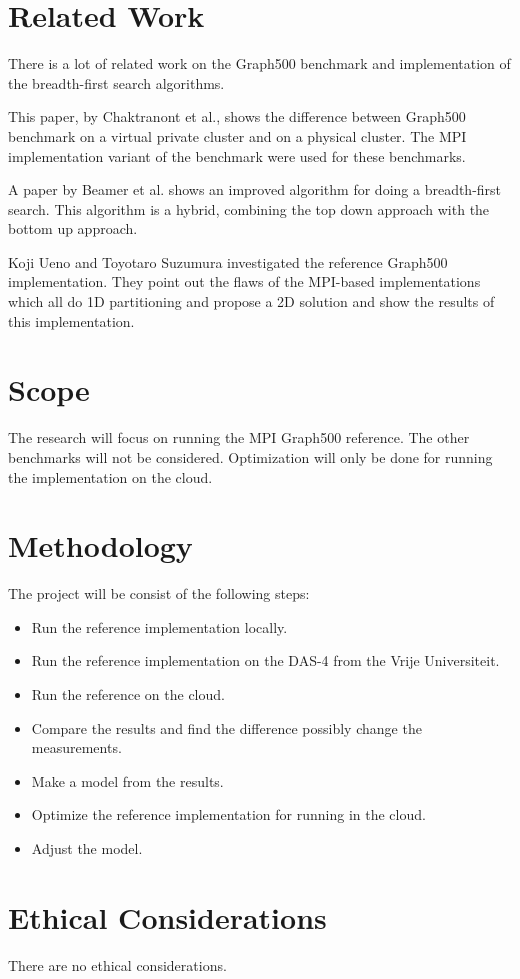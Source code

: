 \documentclass[A4]{scrartcl}
\begin{document}
\section*{Related Work}
There is a lot of related work on the Graph500 benchmark and implementation of the breadth-first search algorithms. 

This paper, by Chaktranont et al.\cite{chakthranont2014exploring}, shows the difference between Graph500 benchmark on a virtual private cluster and on a physical cluster. The MPI implementation variant of the benchmark were used for these benchmarks.

A paper by Beamer et al.\cite{beamer2011searching} shows an improved algorithm for doing a breadth-first search. This algorithm is a hybrid, combining the top down approach with the bottom up approach.

Koji Ueno and Toyotaro Suzumura\cite{ueno2012highly} investigated the reference Graph500 implementation. They point out the flaws of the MPI-based implementations which all do 1D partitioning and propose a 2D solution and show the results of this implementation.

\section*{Scope}
The research will focus on running the MPI Graph500 reference. The other benchmarks will not be considered. Optimization will only be done for running the implementation on the cloud.


\section*{Methodology}
The project will be consist of the following steps:
\begin{itemize}
\item Run the reference implementation locally.
\item Run the reference implementation on the DAS-4 from the Vrije Universiteit.
\item Run the reference on the cloud.
\item Compare the results and find the difference possibly change the measurements.
\item Make a model from the results.
\item Optimize the reference implementation for running in the cloud.
\item Adjust the model.
\end{itemize}


\section*{Ethical Considerations}
There are no ethical considerations.

\printbibliography
\end{document}
